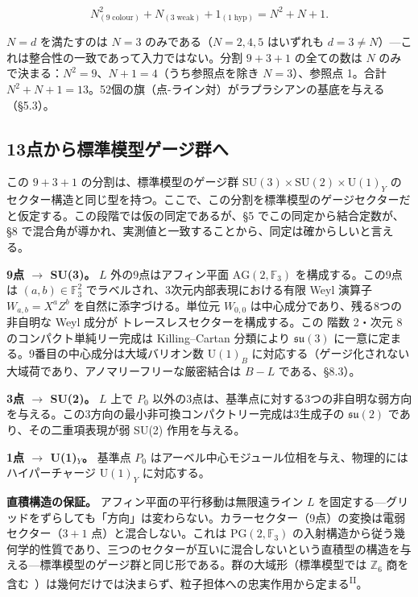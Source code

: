 \documentclass[fontsize=11pt,paper=a4,lualatex]{jlreq}
\newcommand{\PII}{\textsuperscript{\textup{II}}}
\begin{document}
\[N^2_{(9\;\mathrm{colour})} + N_{(3\;\mathrm{weak})} + 1_{(1\;\mathrm{hyp})} = N^2 + N + 1.\]

$N = d$ を満たすのは $N = 3$ のみである（$N = 2, 4, 5$ はいずれも $d = 3 \neq N$）---これは整合性の一致であって入力ではない。分割 $9{+}3{+}1$ の全ての数は $N$ のみで決まる：$N^2 = 9$、$N{+}1 = 4$（うち参照点を除き $N = 3$）、参照点 1。合計 $N^2{+}N{+}1 = 13$。52個の旗（点-ライン対）がラプラシアンの基底を与える（§5.3）。

\subsection{13点から標準模型ゲージ群へ}\label{ux70b9ux304bux3089ux6a19ux6e96ux6a21ux578bux30b2ux30fcux30b8ux7fa4ux3078}

この $9{+}3{+}1$ の分割は、標準模型のゲージ群 $\mathrm{SU}(3){\times}\mathrm{SU}(2){\times}\mathrm{U}(1)_Y$ のセクター構造と同じ型を持つ。ここで、この分割を標準模型のゲージセクターだと仮定する。この段階では仮の同定であるが、§5 でこの同定から結合定数が、§8 で混合角が導かれ、実測値と一致することから、同定は確からしいと言える。

\noindent\textbf{9点 $\to$ SU(3)。} $L$ 外の9点はアフィン平面 $\mathrm{AG}(2, \mathbb{F}_3)$ を構成する。この9点は $(a,b) \in \mathbb{F}_3^2$ でラベルされ、3次元内部表現における有限 Weyl 演算子 $W_{a,b} = X^a Z^b$ を自然に添字づける。単位元 $W_{0,0}$ は中心成分であり、残る8つの非自明な Weyl 成分が トレースレスセクターを構成する。この 階数 2・次元 8 のコンパクト単純リー完成は Killing--Cartan 分類により $\mathfrak{su}(3)$ に一意に定まる。9番目の中心成分は大域バリオン数 $\mathrm{U}(1)_B$ に対応する（ゲージ化されない大域荷であり、アノマリーフリーな厳密結合は $B{-}L$ である、§8.3）。

\noindent\textbf{3点 $\to$ SU(2)。} $L$ 上で $P_0$ 以外の3点は、基準点に対する3つの非自明な弱方向を与える。この3方向の最小非可換コンパクトリー完成は3生成子の $\mathfrak{su}(2)$ であり、その二重項表現が弱 SU(2) 作用を与える。

\noindent\textbf{1点 $\to$ U(1)$_Y$。} 基準点 $P_0$ はアーベル中心モジュール位相を与え、物理的にはハイパーチャージ $\mathrm{U}(1)_Y$ に対応する。

\noindent\textbf{直積構造の保証。} アフィン平面の平行移動は無限遠ライン $L$ を固定する---グリッドをずらしても「方向」は変わらない。カラーセクター（9点）の変換は電弱セクター（$3{+}1$ 点）と混合しない。これは $\mathrm{PG}(2, \mathbb{F}_3)$ の入射構造から従う幾何学的性質であり、三つのセクターが互いに混合しないという直積型の構造を与える---標準模型のゲージ群と同じ形である。群の大域形（標準模型では $\mathbb{Z}_6$ 商を含む~\cite{baezhuerta}）は幾何だけでは決まらず、粒子担体への忠実作用から定まる\PII{}。
\end{document}
